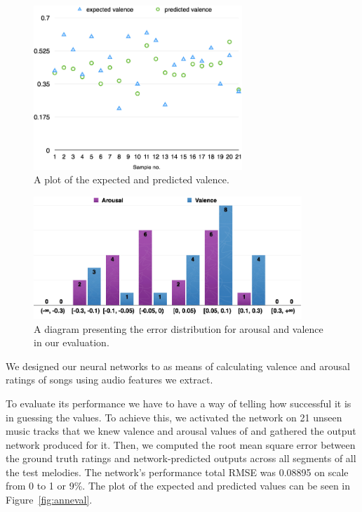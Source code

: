 \begin{figure}[b]
    \vspace{20pt}
    \includegraphics[width=0.7\textwidth]{Figures/finalvalence}
    \centering

  \caption{A plot of the expected and predicted valence.}
  \label{fig:finalvalence}
\end{figure}

\begin{figure}[t]
    \includegraphics[width=0.9\textwidth]{Figures/errors-mood}
    \centering

  \caption{A diagram presenting the error distribution for arousal and valence in our evaluation.}
  \label{fig:errors-mood}
\end{figure}

We designed our neural networks to as means of calculating valence and arousal ratings of songs using audio features we extract. 

To evaluate its performance we have to have a way of telling how successful it is in guessing the values. To achieve this, we activated the network on 21 unseen music tracks that we knew valence and arousal values of and gathered the output network produced for it. Then, we computed the root mean square error between the ground truth ratings and network-predicted outputs across all segments of all the test melodies. The network's performance total RMSE was 0.08895 on scale from 0 to 1 or 9\%. The plot of the expected and predicted values can be seen in Figure~\ref{fig:anneval}.

